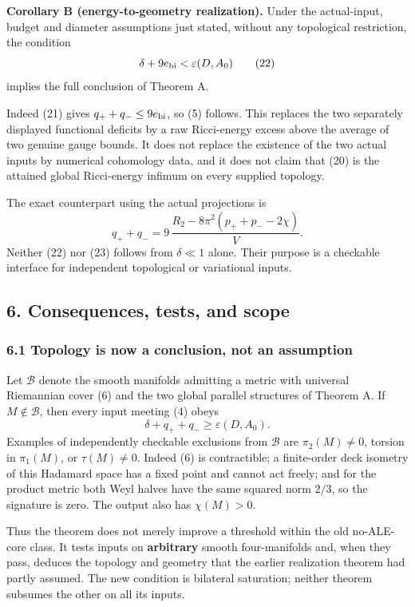 \documentclass[
  11pt,
]{article}
\begin{document}
\textbf{Corollary B (energy-to-geometry realization).} Under the
actual-input, budget and diameter assumptions just stated, without any
topological restriction, the condition \[
                  \delta+9e_{\rm bi}<\varepsilon(D,A_0)
 \tag{22}
\] implies the full conclusion of Theorem A.

Indeed (21) gives \(q_++q_-\le9e_{\rm bi}\), so (5) follows. This
replaces the two separately displayed functional deficits by a raw
Ricci-energy excess above the average of two genuine gauge bounds. It
does not replace the existence of the two actual inputs by numerical
cohomology data, and it does not claim that (20) is the attained global
Ricci-energy infimum on every supplied topology.

The exact counterpart using the actual projections is \[
 q_++q_-=9\,\frac{R_2-8\pi^2(p_++p_--2\chi)}{V}.
 \tag{23}
\] Neither (22) nor (23) follows from \(\delta\ll1\) alone. Their
purpose is a checkable interface for independent topological or
variational inputs.

\hypertarget{consequences-tests-and-scope}{%
\subsection{6. Consequences, tests, and
scope}\label{consequences-tests-and-scope}}

\hypertarget{topology-is-now-a-conclusion-not-an-assumption}{%
\subsubsection{6.1 Topology is now a conclusion, not an
assumption}\label{topology-is-now-a-conclusion-not-an-assumption}}

Let \(\mathcal B\) denote the smooth manifolds admitting a metric with
universal Riemannian cover (6) and the two global parallel structures of
Theorem A. If \(M\notin\mathcal B\), then every input meeting (4) obeys
\[
                  \delta+q_++q_-\ge\varepsilon(D,A_0).
 \tag{24}
\] Examples of independently checkable exclusions from \(\mathcal B\)
are \(\pi_2(M)\ne0\), torsion in \(\pi_1(M)\), or \(\tau(M)\ne0\).
Indeed (6) is contractible; a finite-order deck isometry of this
Hadamard space has a fixed point and cannot act freely; and for the
product metric both Weyl halves have the same squared norm \(2/3\), so
the signature is zero. The output also has \(\chi(M)>0\).

Thus the theorem does not merely improve a threshold within the old
no-ALE-core class. It tests inputs on \textbf{arbitrary} smooth
four-manifolds and, when they pass, deduces the topology and geometry
that the earlier realization theorem had partly assumed. The new
condition is bilateral saturation; neither theorem subsumes the other on
all its inputs.
\end{document}
